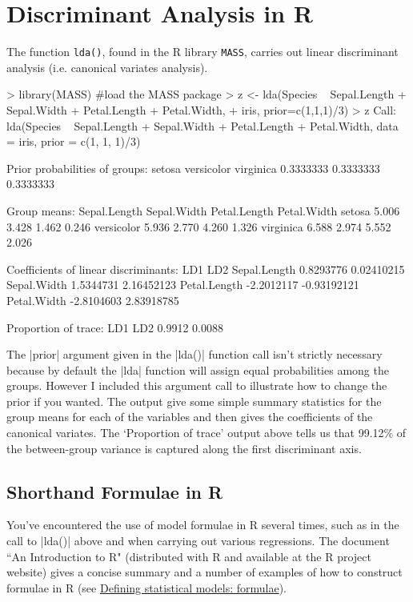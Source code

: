 

\section{Discriminant Analysis in R}

The function \texttt{lda()}, found in the R library \texttt{MASS}, carries out linear discriminant analysis (i.e. canonical variates analysis). 


\begin{R}
> library(MASS) #load the MASS package
> z <- lda(Species ~ Sepal.Length + Sepal.Width + Petal.Length + Petal.Width,
+           iris, prior=c(1,1,1)/3)
> z
Call:
lda(Species ~ Sepal.Length + Sepal.Width + Petal.Length + Petal.Width, 
    data = iris, prior = c(1, 1, 1)/3)

Prior probabilities of groups:
    setosa versicolor  virginica 
 0.3333333  0.3333333  0.3333333 

Group means:
           Sepal.Length Sepal.Width Petal.Length Petal.Width
setosa            5.006       3.428        1.462       0.246
versicolor        5.936       2.770        4.260       1.326
virginica         6.588       2.974        5.552       2.026

Coefficients of linear discriminants:
                    LD1         LD2
Sepal.Length  0.8293776  0.02410215
Sepal.Width   1.5344731  2.16452123
Petal.Length -2.2012117 -0.93192121
Petal.Width  -2.8104603  2.83918785

Proportion of trace:
   LD1    LD2 
0.9912 0.0088 
\end{R}

The |prior| argument given in the |lda()| function call isn't strictly necessary because by default the |lda| function will assign equal probabilities among the groups. However I included this argument call to illustrate how to change the prior if you wanted. The output give some simple summary statistics for the group means for each of the variables and then gives the coefficients of the canonical variates.  The `Proportion of trace' output above tells us that 99.12\% of the between-group variance is captured along the first discriminant axis.

\subsection{Shorthand Formulae in R}

You've encountered the use of model formulae in R several times, such as in the call to |lda()| above and when carrying out various regressions.  The document ``An Introduction to R" (distributed with R and available at the R project website) gives a concise summary and a number of examples of how to construct formulae in R (see \href{http://cran.r-project.org/doc/manuals/R-intro.html#Formulae-for-statistical-models}{Defining statistical models: formulae}).

